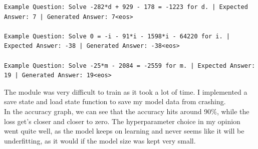 \documentclass{article}
\begin{document}
\begin{lstlisting}[breaklines]
Example Question: Solve -282*d + 929 - 178 = -1223 for d. | Expected Answer: 7 | Generated Answer: 7<eos>

Example Question: Solve 0 = -i - 91*i - 1598*i - 64220 for i. | Expected Answer: -38 | Generated Answer: -38<eos>

Example Question: Solve -25*m - 2084 = -2559 for m. | Expected Answer: 19 | Generated Answer: 19<eos>
\end{lstlisting}
The module was very difficult to train as it took a lot of time. I implemented a save state and load state function to save my model data from crashing.\\
In the accuracy graph, we can see that the accuracy hits around 90\%, while the loss get's closer and closer to zero. The hyperparameter choice in my opinion went quite well, as the model keeps on learning and never seems like it will be underfitting, as it would if the model size was kept very small.
\end{document}

